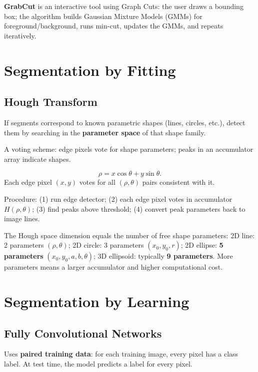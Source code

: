 \documentclass[11pt, oneside]{book}
\begin{document}
\begin{thmbox}[title={Reprojection Error Minimization}]
\begin{defbox}[title={Correlation and Convolution}]
\begin{defbox}[title={ReLU and Pooling}]
\begin{defbox}[title={Segmentation}]
\begin{defbox}[title={Graph-Based Segmentation}]
\textbf{GrabCut} is an interactive tool using Graph Cuts: the user draws a bounding box; the algorithm builds
Gaussian Mixture Models (GMMs) for foreground/background, runs min-cut, updates the GMMs, and repeats iteratively.

\section{Segmentation by Fitting}

\subsection{Hough Transform}

If segments correspond to known parametric shapes (lines, circles, etc.), detect them by searching in the
\textbf{parameter space} of that shape family.

\begin{defbox}[title={Hough Transform}]
A voting scheme: edge pixels vote for shape parameters; peaks in an accumulator array indicate shapes.
\end{defbox}

\begin{thmbox}[title={Line Parameterization}]
\[
\rho = x\cos\theta + y\sin\theta.
\]
Each edge pixel $(x,y)$ votes for all $(\rho,\theta)$ pairs consistent with it.
\end{thmbox}

Procedure: (1) run edge detector; (2) each edge pixel votes in accumulator $H(\rho,\theta)$;
(3) find peaks above threshold; (4) convert peak parameters back to image lines.

The Hough space dimension equals the number of free shape parameters:
2D line: 2 parameters $(\rho,\theta)$; 2D circle: 3 parameters $(x_0,y_0,r)$;
2D ellipse: \textbf{5 parameters} $(x_0,y_0,a,b,\theta)$; 3D ellipsoid: typically \textbf{9 parameters}.
More parameters means a larger accumulator and higher computational cost.

\section{Segmentation by Learning}

\subsection{Fully Convolutional Networks}

\begin{defbox}[title={Learning-Based Semantic Segmentation}]
Uses \textbf{paired training data}: for each training image, every pixel has a class label.
At test time, the model predicts a label for every pixel.
\end{defbox}


\end{defbox}
\end{defbox}
\end{defbox}
\end{defbox}
\end{thmbox}
\end{document}
